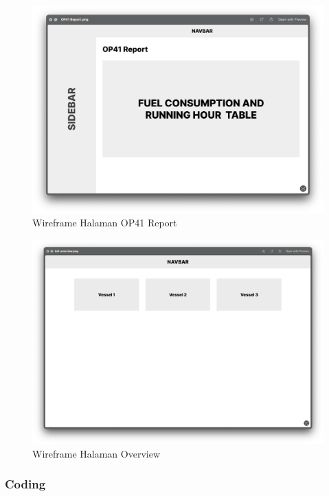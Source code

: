 \begin{figure}[!h]
    \includegraphics[width=1.05\linewidth, center]{images/hasil/iterations/1/lofi-op41.png}
    \caption{Wireframe Halaman OP41 Report}
    \label{fig:lofi-op41}
\end{figure}

\begin{figure}[!h]
    \includegraphics[width=1.05\linewidth, center]{images/hasil/iterations/5/lofi-overview.png}
    \caption{Wireframe Halaman Overview}
    \label{fig:lofi-overview}
\end{figure}

\newpage

\subsubsection{Coding}


